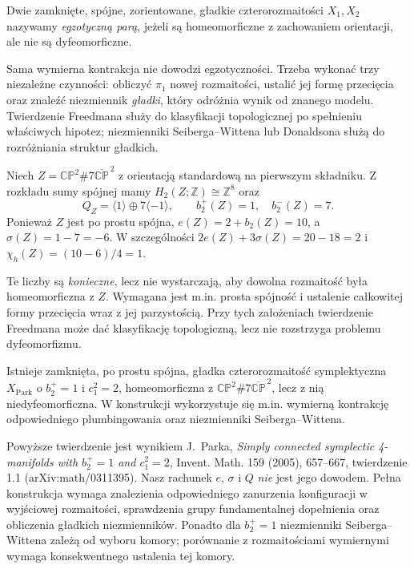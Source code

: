 \begin{definicja}
Dwie zamknięte, spójne, zorientowane, gładkie
czterorozmaitości $X_1,X_2$ nazywamy
\emph{egzotyczną parą}, jeżeli są homeomorficzne
z zachowaniem orientacji, ale nie są dyfeomorficzne.
\end{definicja}

Sama wymierna kontrakcja nie dowodzi egzotyczności.
Trzeba wykonać trzy niezależne czynności:
obliczyć $\pi_1$ nowej rozmaitości, ustalić
jej formę przecięcia oraz znaleźć niezmiennik
\emph{gładki}, który odróżnia wynik od znanego modelu.
Twierdzenie Freedmana służy do klasyfikacji
topologicznej po spełnieniu właściwych hipotez;
niezmienniki Seiberga--Wittena lub Donaldsona
służą do rozróżniania struktur gładkich.

\begin{przyklad}
Niech $Z=\mathbb{CP}^2\#7\overline{\mathbb{CP}}^{\,2}$
z orientacją standardową na pierwszym składniku.
Z rozkładu sumy spójnej mamy
$H_2(Z;\mathbb Z)\cong\mathbb Z^8$ oraz
\[
Q_Z=\langle1\rangle\oplus7\langle-1\rangle,
\qquad b_2^+(Z)=1,\quad b_2^-(Z)=7.
\]
Ponieważ $Z$ jest po prostu spójna,
$e(Z)=2+b_2(Z)=10$, a
$\sigma(Z)=1-7=-6$. W szczególności
$2e(Z)+3\sigma(Z)=20-18=2$ i
$\chi_h(Z)=(10-6)/4=1$.

Te liczby są \emph{konieczne}, lecz nie wystarczają,
aby dowolna rozmaitość była homeomorficzna z $Z$.
Wymagana jest m.in. prosta spójność i ustalenie
całkowitej formy przecięcia wraz z jej parzystością.
Przy tych założeniach twierdzenie Freedmana
może dać klasyfikację topologiczną, lecz nie
rozstrzyga problemu dyfeomorfizmu.
\end{przyklad}

\begin{twierdzenie}
Istnieje zamknięta, po prostu spójna, gładka
czterorozmaitość symplektyczna $X_{\mathrm{Park}}$
o $b_2^+=1$ i $c_1^2=2$,
homeomorficzna z
$\mathbb{CP}^2\#7\overline{\mathbb{CP}}^{\,2}$,
lecz z nią niedyfeomorficzna. W konstrukcji
wykorzystuje się m.in. wymierną kontrakcję
odpowiedniego plumbingowania oraz niezmienniki
Seiberga--Wittena.
\end{twierdzenie}

\begin{uwaga}
Powyższe twierdzenie jest wynikiem J.~Parka,
\emph{Simply connected symplectic 4-manifolds
with $b_2^+=1$ and $c_1^2=2$},
Invent. Math. 159 (2005), 657--667,
twierdzenie 1.1 (arXiv:math/0311395).
Nasz rachunek $e$, $\sigma$ i $Q$ \emph{nie} jest
jego dowodem. Pełna konstrukcja wymaga znalezienia
odpowiedniego zanurzenia konfiguracji w wyjściowej
rozmaitości, sprawdzenia grupy fundamentalnej
dopełnienia oraz obliczenia gładkich niezmienników.
Ponadto dla $b_2^+=1$ niezmienniki
Seiberga--Wittena zależą od wyboru komory;
porównanie z rozmaitościami wymiernymi wymaga
konsekwentnego ustalenia tej komory.
\end{uwaga}

